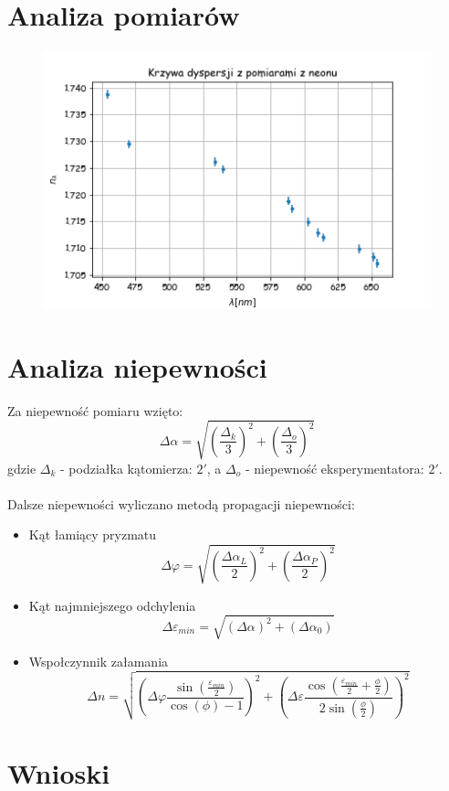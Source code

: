 \documentclass[a4paper,10pt]{article}
\begin{document}
\section{Analiza pomiarów}
\begin{figure} [H]
  \includegraphics{./dyspersja.png}
  \caption{}
  \label{}
\end{figure}

\section{Analiza niepewności}
Za niepewność pomiaru wzięto:
\begin{equation}
  \Delta \alpha = \sqrt{(\frac{\Delta_k}{3})^2+(\frac{\Delta_o}{3})^2}
\end{equation}
gdzie $\Delta_k$ - podziałka kątomierza: $2'$, a $\Delta_o$ - niepewność eksperymentatora: $2'$.\\
\\Dalsze niepewności wyliczano metodą propagacji niepewności:
\begin{itemize}
  \item Kąt łamiący pryzmatu
  \begin{equation}
    \Delta \varphi = \sqrt{(\frac{\Delta \alpha_L}{2})^2+(\frac{\Delta \alpha_P}{2})^2}
  \end{equation}
  \item Kąt najmniejszego odchylenia
  \begin{equation}
    \Delta \varepsilon_{min} = \sqrt{(\Delta \alpha)^2+(\Delta \alpha_0)}
  \end{equation}
  \item Wspołczynnik załamania
  \begin{equation}
    \Delta n = \sqrt{(\Delta \varphi \frac{\sin{\left (\frac{\varepsilon_{min}}{2} \right )}}{\cos{\left (\phi \right )} - 1})^2+
    (\Delta \varepsilon \frac{\cos{\left (\frac{\varepsilon_{min}}{2} + \frac{\phi}{2} \right )}}{2 \sin{\left (\frac{\phi}{2} \right )}})^2}
  \end{equation}
\end{itemize}

\section{Wnioski}
\end{document}
